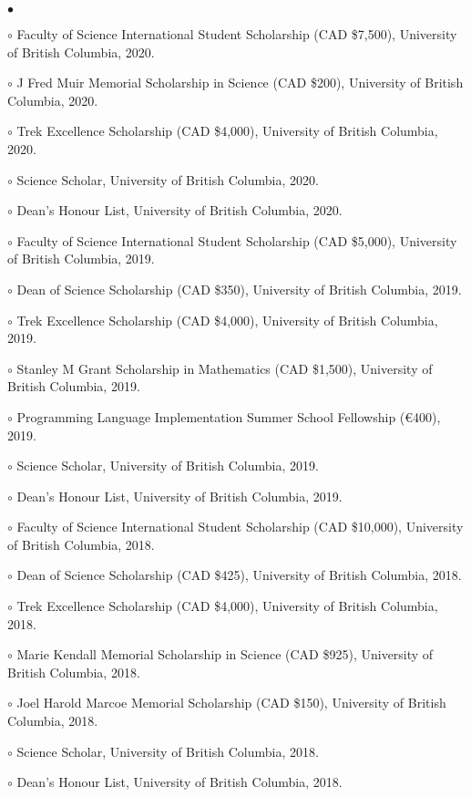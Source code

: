 \documentclass[margin,line]{res}
\newenvironment{list2}{
  \begin{list}{$\bullet$}{%
      \setlength{\itemsep}{0in}
      \setlength{\parsep}{0in} \setlength{\parskip}{0in}
      \setlength{\topsep}{0in} \setlength{\partopsep}{0in}
      \setlength{\leftmargin}{0.2in}}}{\end{list}}
\begin{document}
\begin{resume}
\begin{list2}
\item[$\circ$] Faculty of Science International Student Scholarship (CAD \$7,500), University of British Columbia, 2020.
\item[$\circ$] J Fred Muir Memorial Scholarship in Science (CAD \$200), University of British Columbia, 2020.
\item[$\circ$] Trek Excellence Scholarship (CAD \$4,000), University of British Columbia, 2020.
\item[$\circ$] Science Scholar, University of British Columbia, 2020.
\item[$\circ$] Dean's Honour List, University of British Columbia, 2020.
\item[$\circ$] Faculty of Science International Student Scholarship (CAD \$5,000), University of British Columbia, 2019.
\item[$\circ$] Dean of Science Scholarship (CAD \$350), University of British Columbia, 2019.
\item[$\circ$] Trek Excellence Scholarship (CAD \$4,000), University of British Columbia, 2019.
\item[$\circ$] Stanley M Grant Scholarship in Mathematics (CAD \$1,500), University of British Columbia, 2019.
\item[$\circ$] Programming Language Implementation Summer School Fellowship (€400), 2019.
\item[$\circ$] Science Scholar, University of British Columbia, 2019.
\item[$\circ$] Dean's Honour List, University of British Columbia, 2019.
\item[$\circ$] Faculty of Science International Student Scholarship (CAD \$10,000), University of British Columbia, 2018.
\item[$\circ$] Dean of Science Scholarship (CAD \$425), University of British Columbia, 2018.
\item[$\circ$] Trek Excellence Scholarship (CAD \$4,000), University of British Columbia, 2018.
\item[$\circ$] Marie Kendall Memorial Scholarship in Science (CAD \$925), University of British Columbia, 2018.
\item[$\circ$] Joel Harold Marcoe Memorial Scholarship (CAD \$150), University of British Columbia, 2018.
\item[$\circ$] Science Scholar, University of British Columbia, 2018.
\item[$\circ$] Dean's Honour List, University of British Columbia, 2018.

\end{list2}
\end{resume}
\end{document}
